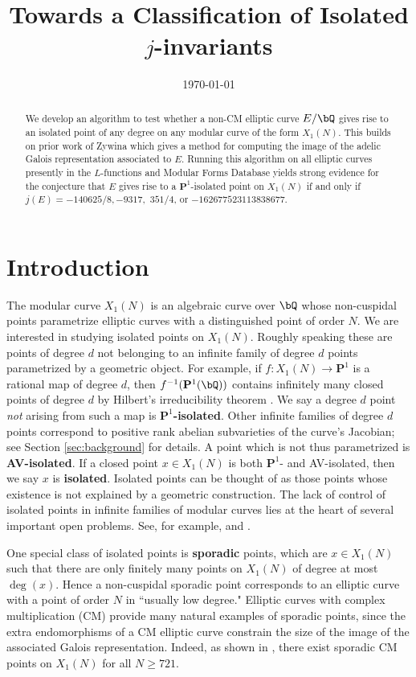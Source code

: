 \documentclass[11pt,reqno]{amsart}
\title{Towards a Classification of Isolated $j$-invariants}
\date{\today}
\theoremstyle{plain}
\theoremstyle{definition}
\newcommand{\Q}{\bQ}
\newcommand{\PP}{\mathbf P}
\begin{document}
\begin{abstract} 
We develop an algorithm to test whether a non-CM elliptic curve $E/\Q$ gives rise to an isolated point of any degree on any modular curve of the form $X_1(N)$. This builds on prior work of Zywina which gives a method for computing the image of the adelic Galois representation associated to $E$. Running this algorithm on all elliptic curves presently in the $L$-functions and Modular Forms Database yields strong evidence for the conjecture that $E$ gives rise to a $\PP^1$-isolated point on $X_1(N)$ if and only if $j(E)=-140625/8, -9317,$ $351/4$, or $-162677523113838677$.
    \end{abstract}
\maketitle

\section{Introduction}
\label{sec:intro}

The modular curve $X_1(N)$ is an algebraic curve over $\Q$ whose non-cuspidal points parametrize elliptic curves with a distinguished point of order $N$. We are interested in studying isolated points on $X_1(N)$. Roughly speaking these are points of degree $d$ not belonging to an infinite family of degree $d$ points parametrized by a geometric object. For example, if $f: X_1(N) \rightarrow \PP^1$ is a rational map of degree $d$, then $f^{-1}(\PP^1(\Q))$ contains infinitely many closed points of degree $d$ by Hilbert's irreducibility theorem \cite[Chapter~9]{serre97}. We say a degree $d$ point \emph{not} arising from such a map is \textbf{$\PP^1$-isolated}. Other infinite families of degree $d$ points correspond to positive rank abelian subvarieties of the curve's Jacobian; see Section \ref{sec:background} for details. A point which is not thus parametrized is \textbf{AV-isolated}. If a closed point $x\in X_1(N)$ is both $\PP^1$- and AV-isolated, then we say $x$ is \textbf{isolated}. Isolated points can be thought of as those points whose existence is not explained by a geometric construction. The lack of control of isolated points in infinite families of modular curves lies at the heart of several important open problems. See, for example, \cite[Question~1]{MazurNote} and \cite[Theorem~1.3]{BourdonNajman2021}.

One special class of isolated points is \textbf{sporadic} points, which are $x \in X_1(N)$ such that there are only finitely many points on $X_1(N)$ of degree at most $\deg(x)$. Hence a non-cuspidal sporadic point corresponds to an elliptic curve with a point of order $N$ in ``usually low degree." Elliptic curves with complex multiplication (CM) provide many natural examples of sporadic points, since the extra endomorphisms of a CM elliptic curve constrain the size of the image of the associated Galois representation. Indeed, as shown in \cite[Theorem~8.2]{CGPS2022}, there exist sporadic CM points on $X_1(N)$ for all $N\geq 721$.
\end{document}
